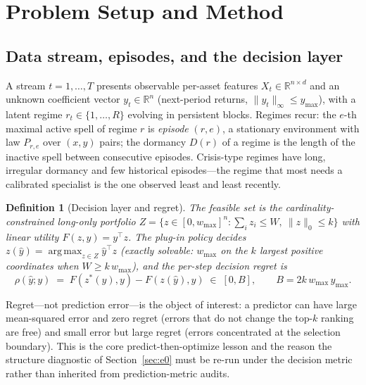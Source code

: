 \documentclass{article}
\newtheorem{definition}{Definition}
\newcommand{\R}{\mathbb{R}}
\newcommand{\regret}{\rho}
\DeclareMathOperator*{\argmax}{arg\,max}
\begin{document}
\section{Problem Setup and Method}
\label{sec:setup}

\subsection{Data stream, episodes, and the decision layer}

A stream $t = 1, \dots, T$ presents observable per-asset features
$X_t \in \R^{n \times d}$ and an unknown coefficient vector $y_t \in \R^n$
(next-period returns, $\|y_t\|_\infty \le y_{\max}$), with a latent regime
$r_t \in \{1, \dots, R\}$ evolving in persistent blocks. Regimes recur:
the $e$-th maximal active spell of regime $r$ is \emph{episode} $(r, e)$,
a stationary environment with law $P_{r,e}$ over $(x, y)$ pairs; the
dormancy $D(r)$ of a regime is the length of the inactive spell between
consecutive episodes. Crisis-type regimes have long, irregular dormancy and
few historical episodes---the regime that most needs a calibrated specialist
is the one observed least and least recently.

\begin{definition}[Decision layer and regret]
\label{def:regret}
The feasible set is the cardinality-constrained long-only portfolio
$Z = \{ z \in [0, w_{\max}]^n : \sum_i z_i \le W,\ \|z\|_0 \le k \}$ with
linear utility $F(z, y) = y^\top z$. The plug-in policy decides
$z(\hat y) = \argmax_{z \in Z} \hat y^\top z$ (exactly solvable: $w_{\max}$
on the $k$ largest positive coordinates when $W \ge k\, w_{\max}$), and the
per-step \emph{decision regret} is
\[
  \regret(\hat y; y) \;=\; F(z^*(y), y) - F(z(\hat y), y) \;\in\; [0, B],
  \qquad B = 2 k\, w_{\max}\, y_{\max}.
\]
\end{definition}

Regret---not prediction error---is the object of interest: a predictor can
have large mean-squared error and zero regret (errors that do not change the
top-$k$ ranking are free) and small error but large regret (errors
concentrated at the selection boundary). This is the core predict-then-optimize
lesson \citep{elmachtoub2022smart, mandi2024decision} and the reason the
structure diagnostic of Section~\ref{sec:e0} must be re-run under the
decision metric rather than inherited from prediction-metric audits.
\end{document}
